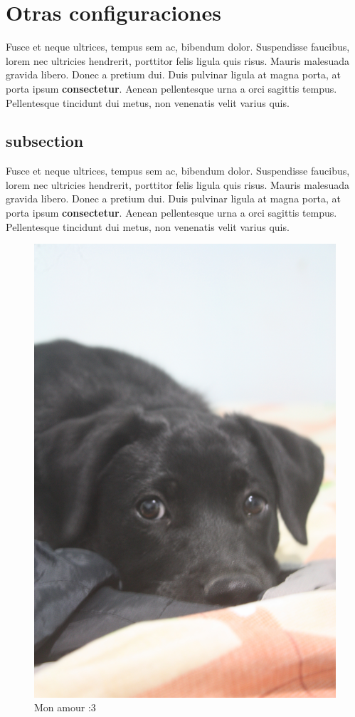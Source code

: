 \documentclass[12pt,letterpaper,oneside]{book}
\begin{document}
\section{Otras configuraciones}

\noindent Fusce et neque ultrices, tempus sem ac, bibendum dolor. Suspendisse faucibus, lorem nec ultricies hendrerit, porttitor felis ligula quis risus. Mauris malesuada gravida libero. Donec a pretium dui. Duis pulvinar ligula at magna porta, at porta ipsum \textbf{consectetur}. Aenean pellentesque urna a orci sagittis tempus. Pellentesque tincidunt dui metus, non venenatis velit varius quis.

\subsection{subsection}
\noindent Fusce et neque ultrices, tempus sem ac, bibendum dolor. Suspendisse faucibus, lorem nec ultricies hendrerit, porttitor felis ligula quis risus. Mauris malesuada gravida libero. Donec a pretium dui. Duis pulvinar ligula at magna porta, at porta ipsum \textbf{consectetur}. Aenean pellentesque urna a orci sagittis tempus. Pellentesque tincidunt dui metus, non venenatis velit varius quis.

\begin{figure}[h]
\centering
\includegraphics[scale=.06]{img/milla.jpg}
\caption{Mon amour :3}
\end{figure}
\end{document}
